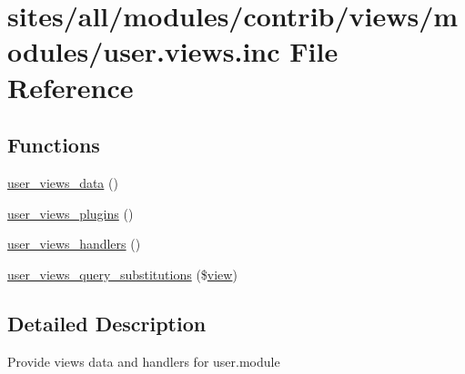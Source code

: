 \hypertarget{user_8views_8inc}{
\section{sites/all/modules/contrib/views/modules/user.views.inc File Reference}
\label{user_8views_8inc}
}
\subsection*{Functions}
\begin{CompactItemize}
\item 
\hyperlink{group__views__user__module_g8de9e9f62db27dac6f5778d4362a7dc2}{user\_\-views\_\-data} ()
\item 
\hyperlink{group__views__user__module_ga36ee99043e81c01d59f8f7c47d310d1}{user\_\-views\_\-plugins} ()
\item 
\hyperlink{group__views__user__module_g51925c2452e1d30a13a4969e4a701c30}{user\_\-views\_\-handlers} ()
\item 
\hyperlink{group__views__user__module_ge3007fb2a7423125b3458d4018293eba}{user\_\-views\_\-query\_\-substitutions} (\$\hyperlink{classview}{view})
\end{CompactItemize}


\subsection{Detailed Description}
Provide views data and handlers for user.module 